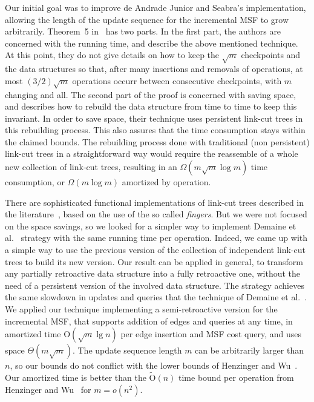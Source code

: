 \documentclass[reqno,11pt]{amsart}
\newcommand{\Oh}{\mathrm{O}}
\begin{document}
Our initial goal was to improve de Andrade Junior and Seabra's implementation,
allowing the length of the update sequence for the incremental MSF to grow arbitrarily.
Theorem~5 in~\cite{DemaineIL2007} has two parts.  In the first part, the authors
are concerned with the running time, and describe the above mentioned technique.
At this point, they do not give details on how to keep the $\sqrt{m}$ checkpoints 
and the data structures so that, after many insertions and removals of operations, 
at most $(3/2)\sqrt{m}$ operations occurr between consecutive checkpoints, with 
$m$ changing and all. The second part of the proof is concerned with saving space, 
and describes how to rebuild the data structure from time to time to keep this
invariant.  In order to save space, their technique uses persistent link-cut 
trees in this rebuilding process.  This also assures that the time consumption
stays within the claimed bounds.  The rebuilding process done with traditional
(non persistent) link-cut trees in a straightforward way would require the 
reassemble of a whole new collection of link-cut trees, resulting in an 
$\Omega(m \sqrt{m} \log{m})$ time consumption, or $\Omega(m \log{m})$ 
amortized by operation.


There are sophisticated functional implementations of link-cut trees described in 
the literature~\cite{DemaineLP2008}, based on the use of the so called \emph{fingers}.  
But we were not focused on the space savings, so we looked for a simpler way to 
implement Demaine et al.~\cite{DemaineIL2007} strategy with the same running time 
per operation.  Indeed, we came up with a simple way to use the previous version 
of the collection of independent link-cut trees to build its new version.  
Our result can be applied in general, to transform any partially retroactive 
data structure into a fully retroactive one, without the need of a persistent 
version of the involved data structure.  The strategy achieves the same slowdown 
in updates and queries that the technique of Demaine et al.~\cite{DemaineIL2007}.  
We applied our technique implementing a semi-retroactive version for the 
incremental MSF, that supports addition of edges and queries at any time, 
in amortized time $\Oh(\sqrt{m}\lg n)$ per edge insertion and MSF cost query, 
and uses space $\Theta(m\sqrt{m})$.  The update sequence length $m$ can be 
arbitrarily larger than~$n$, so our bounds do not conflict with the lower 
bounds of Henzinger and Wu~\cite{HenzingerW2021}. Our amortized time is better 
than the $\tilde{\Oh}(n)$ time bound per operation from Henzinger and 
Wu~\cite{HenzingerW2021} for $m = o(n^2)$.
\end{document}
